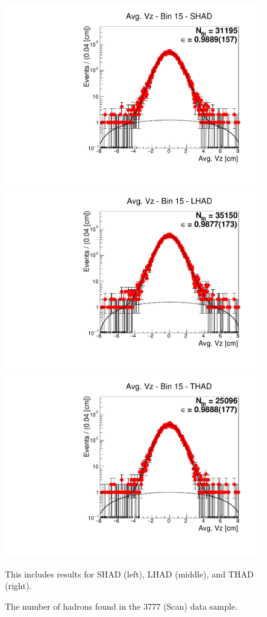 \begin{figure}[H]
\centering
\includegraphics[scale=0.25]{figures/plots/nonDDbar_fit_results/scan/fit_scan_15_data_SHAD.pdf}
\hspace{-0.5cm}
\includegraphics[scale=0.25]{figures/plots/nonDDbar_fit_results/scan/fit_scan_15_data_LHAD.pdf}
\hspace{-0.5cm}
\includegraphics[scale=0.25]{figures/plots/nonDDbar_fit_results/scan/fit_scan_15_data_THAD.pdf}
\caption{The number of hadrons found in the 3777 (Scan) data sample.}
{This includes results for SHAD (left), LHAD (middle), and THAD (right).}
\label{fig:hadron_fits_scan_15}
\end{figure}

